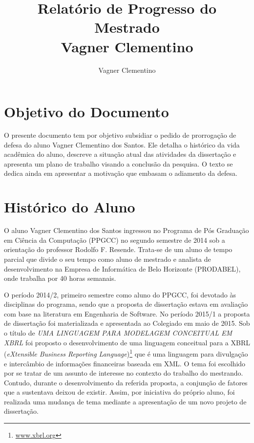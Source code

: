 \documentclass[10pt,a4paper]{report}
\author{Vagner Clementino}
\title{Relatório de Progresso do Mestrado\\
	Vagner Clementino}
\begin{document}
\maketitle

\chapter{Objetivo do Documento}
\label{sec:objetivo}

O presente documento tem por objetivo subsidiar o pedido de prorrogação de
defesa do aluno Vagner Clementino dos Santos. Ele detalha o histórico da vida
acadêmica do aluno, descreve a situação atual das atividades da dissertação e
apresenta um plano de trabalho visando a conclusão da pesquisa. O texto se
dedica ainda em apresentar a motivação que embasam o adiamento da defesa.

\chapter{Histórico do Aluno}
\label{sec:historico}

O aluno Vagner Clementino dos Santos ingressou no Programa de Pós Graduação em
Ciência da Computação (PPGCC) no segundo semestre de 2014 sob a
o\-ri\-en\-ta\-ção do professor Rodolfo F. Resende. Trata-se de um aluno de
tempo parcial que divide o seu tempo como aluno de mestrado e analista de
desenvolvimento na Empresa de Informática de Belo Horizonte (PRODABEL), onde
trabalha por 40 horas semanais.

O período 2014/2, primeiro semestre como aluno do PPGCC, foi devotado às
disciplinas do programa, sendo que a proposta de dissertação estava em avaliação
com base na literatura em Engenharia de Software. No período 2015/1 a proposta
de dissertação foi materializada e apresentada ao Colegiado em maio de 2015. Sob
o título de \textit{UMA LINGUAGEM PARA MODELAGEM CONCEITUAL EM XBRL} foi
proposto o desenvolvimento de uma linguagem conceitual para a XBRL
(\textit{eXtensible Business Reporting Language})\footnote{\url{www.xbrl.org}}
que é uma linguagem para divulgação e intercâmbio de informações financeiras
baseada em XML\@. O tema foi escolhido por se tratar de um assunto de interesse
no contexto do trabalho do mestrando. Contudo, durante o desenvolvimento da
referida proposta, a conjunção de fatores que a sustentava deixou de existir.
Assim, por iniciativa do próprio aluno, foi realizada uma mudança de tema
mediante a apresentação de um novo projeto de dissertação.
\end{document}
